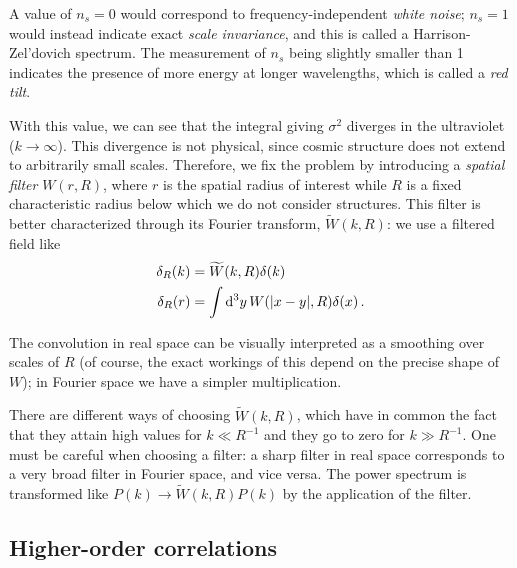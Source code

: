 \documentclass[main.tex]{subfiles}
\begin{document}
A value of \(n_s = 0\) would correspond to frequency-independent \emph{white noise}; \(n_s = 1\) would instead indicate exact \emph{scale invariance}, and this is called a Harrison-Zel'dovich spectrum.
The measurement of \(n_s\) being slightly smaller than 1 indicates the presence of more energy at longer wavelengths, which is called a \emph{red tilt}. 

With this value, we can see that the integral giving \(\sigma^2\) diverges in the ultraviolet (\(k \to \infty\)). 
This divergence is not physical, since cosmic structure does not extend to arbitrarily small scales. Therefore, we fix the problem by introducing a \emph{spatial filter} \(W(r, R)\), where \(r\) is the spatial radius of interest while \(R\) is a fixed characteristic radius below which we do not consider structures. This filter is better characterized through its Fourier transform, \(\widetilde{W}(k, R)\): we use a filtered field like 
%
\begin{align}
\delta_R (k) &= \widetilde{W}(k, R) \delta (k)  \\
\delta _R(r) &= \int \dd[3]{y} W(\abs{x-y}, R) \delta (x)
\,.
\end{align}

The convolution in real space can be visually interpreted as a smoothing over scales of \(R\) (of course, the exact workings of this depend on the precise shape of \(W\)); in Fourier space we have a simpler multiplication.

There are different ways of choosing \(\widetilde{W}(k, R)\), which have in common the fact that they attain high values for \(k \ll R^{-1}\) and they go to zero for \(k \gg R^{-1}\). 
One must be careful when choosing a filter: a sharp filter in real space corresponds to a very broad filter in Fourier space, and vice versa. 
The power spectrum is transformed like \(P(k) \to \widetilde{W}(k, R) P(k)\) by the application of the filter.

\subsection{Higher-order correlations}



%




\end{document}
